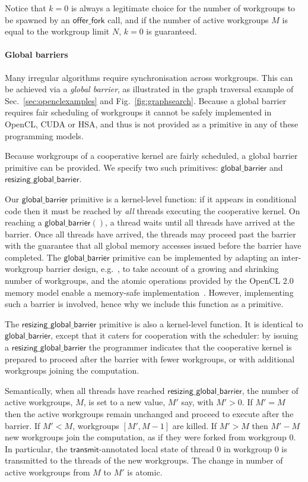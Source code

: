 \documentclass[numbers,nocopyrightspace,10pt]{sigplanconf}
\newcommand{\myfig}{Fig.~}
\newcommand{\mysec}{Sec.~}
\newcommand{\transmit}{\mathsf{transmit}}
\newcommand{\offerfork}{\mathsf{offer\_fork}}
\newcommand{\globalbarrier}{\mathsf{global\_barrier}}
\newcommand{\resizingglobalbarrier}{\mathsf{resizing\_global\_barrier}}
\begin{document}
Notice that $k=0$ is always a legitimate choice for the number of
workgroups to be spawned by an $\offerfork$ call, and if the number of
active workgroups $M$ is equal to the workgroup limit $N$, $k=0$ is
guaranteed.

\paragraph{Global barriers}

Many irregular algorithms require synchronisation across workgroups.
This can be achieved via a \emph{global barrier}, as illustrated in the graph traversal example of \mysec\ref{sec:openclexamples} and \myfig\ref{fig:graphsearch}.
Because a global barrier requires fair scheduling of workgroups it cannot be safely implemented in OpenCL, CUDA or HSA, and thus is not provided as a primitive in any of these programming models.

Because workgroups of a cooperative kernel are fairly scheduled, a
global barrier primitive can be provided.  We specify two such primitives: $\globalbarrier$
and $\resizingglobalbarrier$.

Our $\globalbarrier$ primitive is a kernel-level function: if it
appears in conditional code then it must be reached by \emph{all}
threads executing the cooperative kernel.  On reaching a
$\globalbarrier()$, a thread waits until all threads have arrived at
the barrier.  Once all threads have arrived, the threads may proceed
past the barrier with the guarantee that all global memory accesses
issued before the barrier have completed.  The $\globalbarrier$
primitive can be implemented by adapting an inter-workgroup barrier
design, e.g.~\cite{XF10}, to take account of a growing and shrinking number of workgroups, and the atomic operations provided by
the OpenCL 2.0 memory model enable a memory-safe
implementation~\cite{DBLP:conf/oopsla/SorensenDBGR16}.  However, implementing such a barrier is
involved, hence why we include this function as a primitive.

The $\resizingglobalbarrier$ primitive is also a kernel-level
function.  It is identical to $\globalbarrier$, except that it caters
for cooperation with the scheduler: by issuing a
$\resizingglobalbarrier$ the programmer indicates that the cooperative
kernel is prepared to proceed after the barrier with fewer workgroups,
or with additional workgroups joining the computation.

Semantically, when all threads have reached $\resizingglobalbarrier$,
the number of active workgroups, $M$, is set to a new value, $M'$ say, with $M' > 0$.
If $M' = M$ then the active workgroups remain unchanged and proceed to
execute after the barrier.  If $M' < M$, workgroups $[M', M-1]$ are
killed.  If $M' > M$ then $M'-M$ new workgroups join the computation,
as if they were forked from workgroup 0.  In particular, the
$\transmit$-annotated local state of thread 0 in workgroup 0 is
transmitted to the threads of the new workgroups.  The change in
number of active workgroups from $M$ to $M'$ is atomic.
\end{document}
